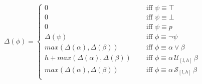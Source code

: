 \documentclass[10pt,a4paper]{article}
\begin{document}


\begin{align*}
\Delta(\phi) = \left\lbrace
\begin{aligned}
0 & \quad \text{ iff } \psi \equiv \top \\
0 & \quad \text{ iff } \psi \equiv \bot \\
0 & \quad \text{ iff } \psi \equiv p \\
\Delta(\psi) & \quad \text{ iff } \phi \equiv \neg \psi \\
max(\Delta(\alpha),\Delta(\beta)) & \quad \text{ iff } \phi \equiv \alpha \vee \beta \\
h + max(\Delta(\alpha),\Delta(\beta)) & \quad \text{ iff } \phi \equiv \alpha\, \mathcal{U}_{[l,h]}\, \beta \\
max(\Delta(\alpha),\Delta(\beta)) & \quad \text{ iff } \phi \equiv \alpha\, \mathcal{S}_{[l,h]}\, \beta \\
\end{aligned} \right. 
\end{align*}
\end{document}
